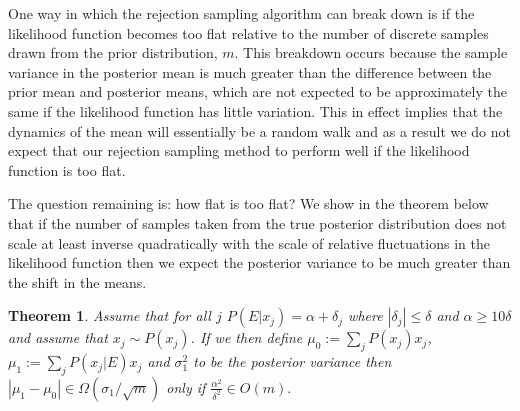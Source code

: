 \documentclass[aps,pra,amsmath,twocolumn,amssymb,superscriptaddress]{revtex4-1}
\newtheorem{theorem}{Theorem}
\begin{document}
One way in which the rejection sampling algorithm can break down is if the likelihood function becomes too flat relative to the number of discrete samples drawn from the prior distribution, $m$.  This breakdown occurs because the sample variance in the posterior mean is much greater than the difference between the prior mean and posterior means, which are not expected to be approximately the same if the likelihood function has little variation.  This in effect implies that the dynamics of the mean will essentially be a random walk and as a result we do not expect that our rejection sampling method to perform well if the likelihood function is too flat.

The question remaining is: how flat is too flat?  We show in the theorem below that if the number of samples taken from the true posterior distribution does not scale at least inverse quadratically with the scale of relative fluctuations in the likelihood function then we expect the posterior variance to be much greater than the shift in the means.  
\begin{theorem}
Assume that for all $j$ $P(E|x_j) =\alpha+\delta_j$ where $|\delta_j|\le \delta$ and $\alpha \ge 10\delta$ and assume that $x_j\sim P(x_j)$.  If we then define $\mu_0 := \sum_{j} P(x_j) x_j$, $\mu_1:= \sum_j P(x_j|E) x_j$ and $\sigma_1^2$ to be the posterior variance then $|\mu_1 - \mu_0| \in \Omega(\sigma_1/\sqrt{m})$ only if
$
\frac{\alpha^2}{\delta^2}\in O(m) .
$\label{thm:stability}
\end{theorem}
\end{document}
